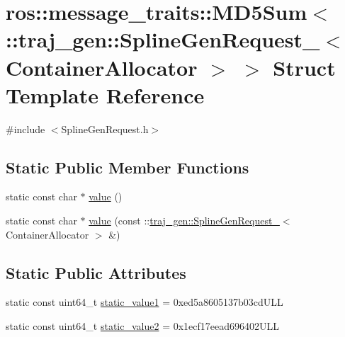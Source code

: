 \hypertarget{structros_1_1message__traits_1_1_m_d5_sum_3_01_1_1traj__gen_1_1_spline_gen_request___3_01_container_allocator_01_4_01_4}{}\section{ros\+:\+:message\+\_\+traits\+:\+:M\+D5\+Sum$<$ \+:\+:traj\+\_\+gen\+:\+:Spline\+Gen\+Request\+\_\+$<$ Container\+Allocator $>$ $>$ Struct Template Reference}
\label{structros_1_1message__traits_1_1_m_d5_sum_3_01_1_1traj__gen_1_1_spline_gen_request___3_01_container_allocator_01_4_01_4}


{\ttfamily \#include $<$Spline\+Gen\+Request.\+h$>$}

\subsection*{Static Public Member Functions}
\begin{DoxyCompactItemize}
\item 
static const char $\ast$ \hyperlink{structros_1_1message__traits_1_1_m_d5_sum_3_01_1_1traj__gen_1_1_spline_gen_request___3_01_container_allocator_01_4_01_4_acc95bbc1507e3c52941e3a5f41b9f32d}{value} ()
\item 
static const char $\ast$ \hyperlink{structros_1_1message__traits_1_1_m_d5_sum_3_01_1_1traj__gen_1_1_spline_gen_request___3_01_container_allocator_01_4_01_4_a420d69aa16318f033664cb6cb39e6425}{value} (const \+::\hyperlink{structtraj__gen_1_1_spline_gen_request__}{traj\+\_\+gen\+::\+Spline\+Gen\+Request\+\_\+}$<$ Container\+Allocator $>$ \&)
\end{DoxyCompactItemize}
\subsection*{Static Public Attributes}
\begin{DoxyCompactItemize}
\item 
static const uint64\+\_\+t \hyperlink{structros_1_1message__traits_1_1_m_d5_sum_3_01_1_1traj__gen_1_1_spline_gen_request___3_01_container_allocator_01_4_01_4_aa66200588fae4be5b5d4409ee501d238}{static\+\_\+value1} = 0xed5a8605137b03cd\+U\+LL
\item 
static const uint64\+\_\+t \hyperlink{structros_1_1message__traits_1_1_m_d5_sum_3_01_1_1traj__gen_1_1_spline_gen_request___3_01_container_allocator_01_4_01_4_adb52a1a8a60320b333dfa188653c6a66}{static\+\_\+value2} = 0x1ecf17eead696402\+U\+LL
\end{DoxyCompactItemize}


